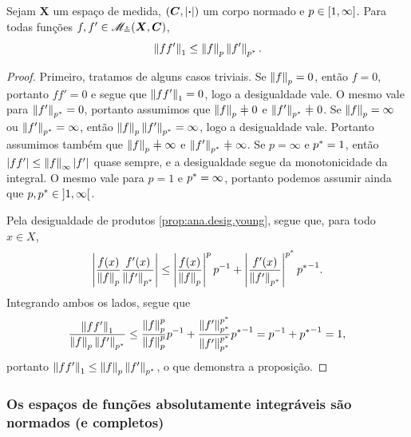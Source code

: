 \begin{proposition}
\label{prop:ana.desig.holder}
Sejam $\bm X$ um espaço de medida, $(\bm C,\left\vert{\bm{\cdot}}\right\vert)$ um corpo normado e $p \in \left[1,\allowbreak \infty\right]$. Para todas funções $f,f' \in \mathscr{M}_{\circeq}(\bm X,\bm C)$,
	\begin{equation*}
	\left\Vert{ff'}\right\Vert_1 \leq \left\Vert{f}\right\Vert_p \left\Vert{f'}\right\Vert_{p^{\ast}}.
	\end{equation*}
\end{proposition}
\begin{proof}
Primeiro, tratamos de alguns casos triviais. Se $\left\Vert{f}\right\Vert_p=0$, então $f=0$, portanto $ff'=0$ e segue que $\left\Vert{ff'}\right\Vert_1=0$, logo a desigualdade vale. O mesmo vale para $\left\Vert{f'}\right\Vert_{p^{\ast}}=0$, portanto assumimos que $\nor{f}_p \neq 0$ e $\nor{f'}_{p\dual} \neq 0$. Se $\left\Vert{f}\right\Vert_p=\infty$ ou $\left\Vert{f'}\right\Vert_{p^{\ast}}=\infty$, então $\left\Vert{f}\right\Vert_p \left\Vert{f'}\right\Vert_{p^{\ast}}=\infty$, logo a desigualdade vale. Portanto assumimos também que $\nor{f}_p \neq \infty$ e $\nor{f'}_{p\dual} \neq \infty$. Se $p=\infty$ e ${p^{\ast}}=1$, então $\left\vert{ff'}\right\vert \leq \left\Vert{f}\right\Vert_\infty \left\vert{f'}\right\vert$ quase sempre, e a desigualdade segue da monotonicidade da integral. O mesmo vale para $p=1$ e ${p^{\ast}}=\infty$, portanto podemos assumir ainda que $p,{p^{\ast}} \in \left]1,\allowbreak \infty\right[$.

Pela desigualdade de produtos \ref{prop:ana.desig.young}, segue que, para todo $x \in X$,
	\begin{equation*}
	\left\vert{\frac{f(x)}{\left\Vert{f}\right\Vert_p} \frac{f'(x)}{\left\Vert{f'}\right\Vert_{p^{\ast}}}}\right\vert \leq \left\vert{\frac{f(x)}{\left\Vert{f}\right\Vert_p}}\right\vert^p p^{-1} + \left\vert{\frac{f'(x)}{\left\Vert{f'}\right\Vert_{p^{\ast}}}}\right\vert^{p^{\ast}} {p^{\ast}}^{-1}.
	\end{equation*}
Integrando ambos os lados, segue que
	\begin{equation*}
	\frac{\left\Vert{ff'}\right\Vert_1}{\left\Vert{f}\right\Vert_p \left\Vert{f'}\right\Vert_{p^{\ast}}} \leq \frac{\left\Vert{f}\right\Vert_p^p}{\left\Vert{f}\right\Vert_p^p} p^{-1} + \frac{\left\Vert{f'}\right\Vert_{p^{\ast}}^{p^{\ast}}}{\left\Vert{f'}\right\Vert_{p^{\ast}}^{p^{\ast}}} {p^{\ast}}^{-1} = p^{-1} + {p^{\ast}}^{-1} = 1,
	\end{equation*}
portanto $\left\Vert{ff'}\right\Vert_1 \leq \left\Vert{f}\right\Vert_p \left\Vert{f'}\right\Vert_{p^{\ast}}$, o que demonstra a proposição.
\end{proof}

\subsubsection{Os espaços de funções absolutamente integráveis são normados (e completos)}

